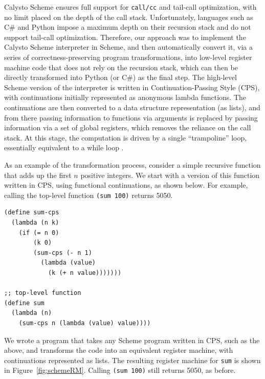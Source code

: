 \documentclass[acmsmall,screen,nonacm]{acmart}
\begin{document}
Calysto Scheme ensures full support for \texttt{call/cc} and tail-call
optimization, with no limit placed on the depth of the call stack.
Unfortunately, languages such as C\# and Python impose a maximum depth on their
recursion stack and do not support tail-call optimization.  Therefore, our
approach was to implement the Calysto Scheme interpreter in Scheme, and then
automatically convert it, via a series of correctness-preserving program
transformations, into low-level register machine code that does not rely on the
recursion stack, which can then be directly transformed into Python (or C\#) as
the final step.  The high-level Scheme version of the interpreter is written in
Continuation-Passing Style (CPS), with continuations initially represented as
anonymous lambda functions.  The continuations are then converted to a data
structure representation (as lists), and from there passing information to
functions via arguments is replaced by passing information via a set of global
registers, which removes the reliance on the call stack.  At this stage, the
computation is driven by a single ``trampoline'' loop, essentially equivalent
to a while loop \cite{Ganz99, EOPL3}.

As an example of the transformation process, consider a simple recursive
function that adds up the first $n$ positive integers.  We start with a version
of this function written in CPS, using functional continuations, as shown
below.  For example, calling the top-level function \texttt{(sum 100)} returns
5050.

\pagebreak

\begin{minipage}{\textwidth}
{\small
\begin{verbatim}
(define sum-cps
  (lambda (n k)
    (if (= n 0)
        (k 0)
        (sum-cps (- n 1)
          (lambda (value)
            (k (+ n value)))))))

;; top-level function
(define sum
  (lambda (n)
    (sum-cps n (lambda (value) value))))

\end{verbatim}
}
\end{minipage}

\noindent
We wrote a program that takes any Scheme program written in CPS, such as the
above, and transforms the code into an equivalent register machine, with
continuations represented as lists.  The resulting register machine for
\texttt{sum} is shown in Figure~\ref{fig:schemeRM}.  Calling \texttt{(sum 100)}
still returns 5050, as before.
\end{document}
